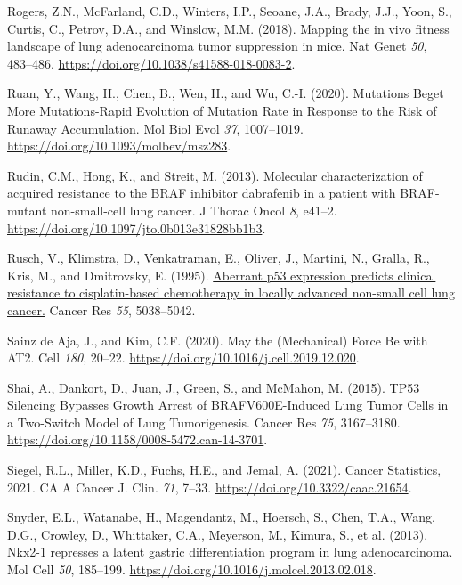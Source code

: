 \begin{CSLReferences}{0}{0}
\leavevmode{}%
Rogers, Z.N., McFarland, C.D., Winters, I.P., Seoane, J.A., Brady, J.J., Yoon, S., Curtis, C., Petrov, D.A., and Winslow, M.M. (2018). Mapping the in vivo fitness landscape of lung adenocarcinoma tumor suppression in mice. Nat Genet \emph{50}, 483--486. \url{https://doi.org/10.1038/s41588-018-0083-2}.

\leavevmode{}%
Ruan, Y., Wang, H., Chen, B., Wen, H., and Wu, C.-I. (2020). Mutations Beget More Mutations-Rapid Evolution of Mutation Rate in Response to the Risk of Runaway Accumulation. Mol Biol Evol \emph{37}, 1007--1019. \url{https://doi.org/10.1093/molbev/msz283}.

\leavevmode{}%
Rudin, C.M., Hong, K., and Streit, M. (2013). Molecular characterization of acquired resistance to the BRAF inhibitor dabrafenib in a patient with BRAF-mutant non-small-cell lung cancer. J Thorac Oncol \emph{8}, e41--2. \url{https://doi.org/10.1097/jto.0b013e31828bb1b3}.

\leavevmode{}%
Rusch, V., Klimstra, D., Venkatraman, E., Oliver, J., Martini, N., Gralla, R., Kris, M., and Dmitrovsky, E. (1995). \href{https://www.ncbi.nlm.nih.gov/pubmed/7585548}{Aberrant p53 expression predicts clinical resistance to cisplatin-based chemotherapy in locally advanced non-small cell lung cancer.} Cancer Res \emph{55}, 5038--5042.

\leavevmode{}%
Sainz de Aja, J., and Kim, C.F. (2020). May the (Mechanical) Force Be with AT2. Cell \emph{180}, 20--22. \url{https://doi.org/10.1016/j.cell.2019.12.020}.

\leavevmode{}%
Shai, A., Dankort, D., Juan, J., Green, S., and McMahon, M. (2015). TP53 Silencing Bypasses Growth Arrest of BRAFV600E-Induced Lung Tumor Cells in a Two-Switch Model of Lung Tumorigenesis. Cancer Res \emph{75}, 3167--3180. \url{https://doi.org/10.1158/0008-5472.can-14-3701}.

\leavevmode{}%
Siegel, R.L., Miller, K.D., Fuchs, H.E., and Jemal, A. (2021). Cancer Statistics, 2021. CA A Cancer J. Clin. \emph{71}, 7--33. \url{https://doi.org/10.3322/caac.21654}.

\leavevmode{}%
Snyder, E.L., Watanabe, H., Magendantz, M., Hoersch, S., Chen, T.A., Wang, D.G., Crowley, D., Whittaker, C.A., Meyerson, M., Kimura, S., et al. (2013). Nkx2-1 represses a latent gastric differentiation program in lung adenocarcinoma. Mol Cell \emph{50}, 185--199. \url{https://doi.org/10.1016/j.molcel.2013.02.018}.


\end{CSLReferences}
